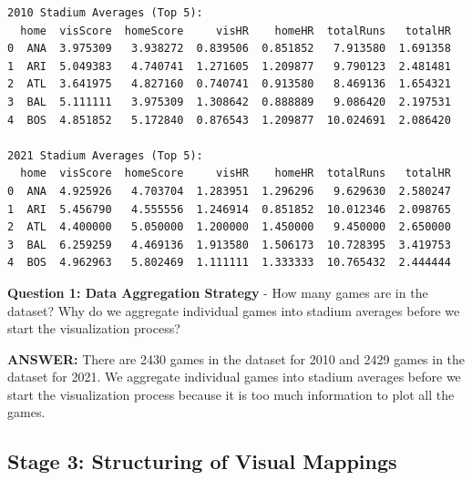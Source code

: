 \documentclass[
  letterpaper,
  DIV=11,
  numbers=noendperiod]{scrartcl}
\begin{document}
\begin{verbatim}
2010 Stadium Averages (Top 5):
  home  visScore  homeScore     visHR    homeHR  totalRuns   totalHR
0  ANA  3.975309   3.938272  0.839506  0.851852   7.913580  1.691358
1  ARI  5.049383   4.740741  1.271605  1.209877   9.790123  2.481481
2  ATL  3.641975   4.827160  0.740741  0.913580   8.469136  1.654321
3  BAL  5.111111   3.975309  1.308642  0.888889   9.086420  2.197531
4  BOS  4.851852   5.172840  0.876543  1.209877  10.024691  2.086420

2021 Stadium Averages (Top 5):
  home  visScore  homeScore     visHR    homeHR  totalRuns   totalHR
0  ANA  4.925926   4.703704  1.283951  1.296296   9.629630  2.580247
1  ARI  5.456790   4.555556  1.246914  0.851852  10.012346  2.098765
2  ATL  4.400000   5.050000  1.200000  1.450000   9.450000  2.650000
3  BAL  6.259259   4.469136  1.913580  1.506173  10.728395  3.419753
4  BOS  4.962963   5.802469  1.111111  1.333333  10.765432  2.444444
\end{verbatim}

\begin{tcolorbox}[enhanced jigsaw, rightrule=.15mm, coltitle=black, colbacktitle=quarto-callout-important-color!10!white, opacitybacktitle=0.6, arc=.35mm, leftrule=.75mm, colback=white, title=\textcolor{quarto-callout-important-color}{\faExclamation}\hspace{0.5em}{🤔 Discussion Questions: Stage 2 - Curation of Content}, colframe=quarto-callout-important-color-frame, bottomrule=.15mm, left=2mm, opacityback=0, toptitle=1mm, titlerule=0mm, toprule=.15mm, bottomtitle=1mm, breakable]

\textbf{Question 1: Data Aggregation Strategy} - How many games are in
the dataset? Why do we aggregate individual games into stadium averages
before we start the visualization process?

\end{tcolorbox}

\textbf{ANSWER:} There are 2430 games in the dataset for 2010 and 2429
games in the dataset for 2021. We aggregate individual games into
stadium averages before we start the visualization process because it is
too much information to plot all the games.

\subsection{Stage 3: Structuring of Visual
Mappings}\label{stage-3-structuring-of-visual-mappings}
\end{document}
